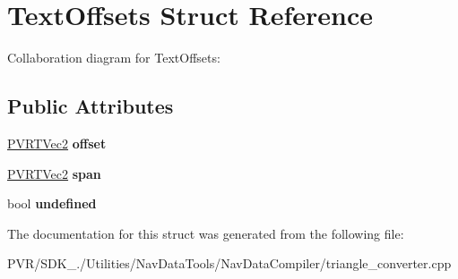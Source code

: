 \hypertarget{struct_text_offsets}{\section{Text\+Offsets Struct Reference}
\label{struct_text_offsets}
}


Collaboration diagram for Text\+Offsets\+:
\subsection*{Public Attributes}
\begin{DoxyCompactItemize}
\item 
\hypertarget{struct_text_offsets_a5fbe78222d7bafe6bd484e7003f8aad9}{\hyperlink{struct_p_v_r_t_vec2}{P\+V\+R\+T\+Vec2} {\bfseries offset}}\label{struct_text_offsets_a5fbe78222d7bafe6bd484e7003f8aad9}

\item 
\hypertarget{struct_text_offsets_ad0a9380d130116601e327631260bb004}{\hyperlink{struct_p_v_r_t_vec2}{P\+V\+R\+T\+Vec2} {\bfseries span}}\label{struct_text_offsets_ad0a9380d130116601e327631260bb004}

\item 
\hypertarget{struct_text_offsets_afa58f22736bab9e1490e22f8666df14f}{bool {\bfseries undefined}}\label{struct_text_offsets_afa58f22736bab9e1490e22f8666df14f}

\end{DoxyCompactItemize}


The documentation for this struct was generated from the following file\+:\begin{DoxyCompactItemize}
\item 
P\+V\+R/\+S\+D\+K\+\_./\+Utilities/\+Nav\+Data\+Tools/\+Nav\+Data\+Compiler/triangle\+\_\+converter.\+cpp\end{DoxyCompactItemize}
